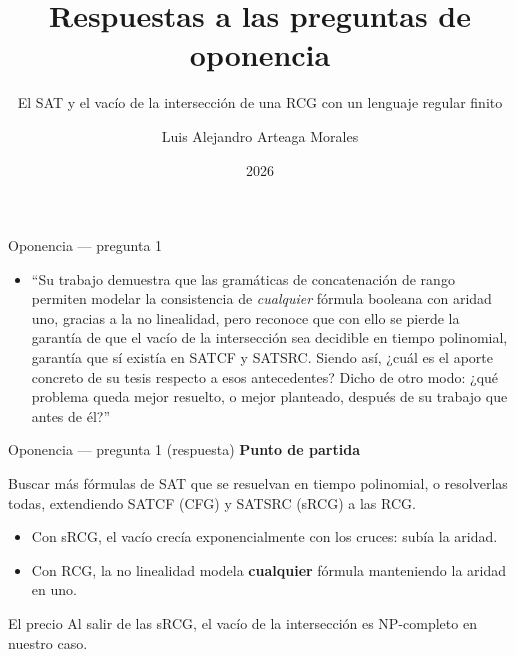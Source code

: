 \documentclass{beamer}
\title[Preguntas de oponencia]
{Respuestas a las preguntas de oponencia}
\subtitle{El SAT y el vacío de la intersección de una RCG con un lenguaje regular finito}
\author{Luis Alejandro Arteaga Morales}
\institute[MATCOM]{Facultad de Matemática y Computación \\ Universidad de La Habana}
\date{2026}
\begin{document}
\begin{frame}
  \titlepage
\end{frame}

\begin{frame}{Oponencia --- pregunta 1}
  \small
  \begin{itemize}
    \item ``Su trabajo demuestra que las gramáticas de concatenación de rango permiten modelar la consistencia de \emph{cualquier} fórmula booleana con aridad uno, gracias a la no linealidad, pero reconoce que con ello se pierde la garantía de que el vacío de la intersección sea decidible en tiempo polinomial, garantía que sí existía en SATCF y SATSRC. Siendo así, ¿cuál es el aporte concreto de su tesis respecto a esos antecedentes? Dicho de otro modo: ¿qué problema queda mejor resuelto, o mejor planteado, después de su trabajo que antes de él?''
  \end{itemize}
\end{frame}

\begin{frame}{Oponencia --- pregunta 1 (respuesta)}
  \textbf{Punto de partida}

  Buscar más fórmulas de SAT que se resuelvan en tiempo polinomial, o resolverlas todas, extendiendo SATCF (CFG) y SATSRC (sRCG) a las RCG.

  \pause
  \vspace{0.3cm}

  \begin{itemize}
    \item Con sRCG, el vacío crecía exponencialmente con los cruces: subía la aridad.
    \item \pause Con RCG, la no linealidad modela \textbf{cualquier} fórmula manteniendo la aridad en uno.
  \end{itemize}

  \pause

  \begin{block}{El precio}
    Al salir de las sRCG, el vacío de la intersección es NP-completo en nuestro caso.
  \end{block}
\end{frame}
\end{document}

